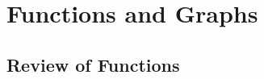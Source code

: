 \documentclass[11pt, letterpaper, oneside]{memoir}
\begin{document}
\chapter{Functions and Graphs}

\section{Review of Functions}


\end{document}
